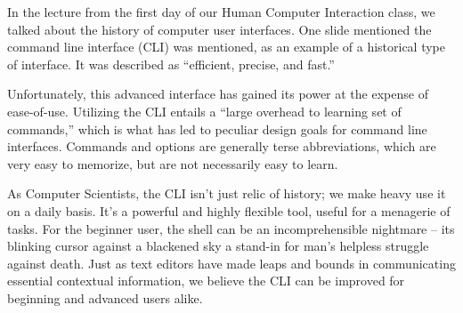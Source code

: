 In the lecture from the first day of our Human Computer Interaction class, we
talked about the history of computer user interfaces. One slide mentioned the
command line interface (CLI) was mentioned, as an example of a historical type
of interface. It was described as ``efficient, precise, and fast.''

Unfortunately, this advanced interface has gained its power at the expense of
ease-of-use. Utilizing the CLI entails a ``large overhead to learning set of
commands,'' which is what has led to peculiar design goals for command line
interfaces. Commands and options are generally terse abbreviations, which are
very easy to memorize, but are not necessarily easy to learn.

As Computer Scientists, the CLI isn’t just relic of history; we make heavy use
it on a daily basis. It’s a powerful and highly flexible tool, useful for a
menagerie of tasks. For the beginner user, the shell can be an incomprehensible
nightmare \--- its blinking cursor against a blackened sky a stand-in for man's
helpless struggle against death. Just as text editors have made leaps and bounds
in communicating essential contextual information, we believe the CLI can be
improved for beginning and advanced users alike.


